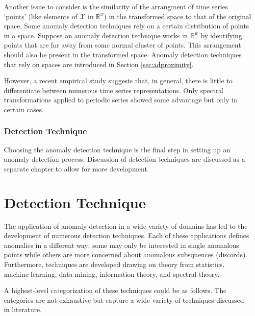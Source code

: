 Another issue to consider is the similarity of the arrangment of time series `points' (like elements of $\mathcal{X}$ in $\mathbb{R}^w$) in the transformed space to that of the original space. Some anomaly detection techniques rely on a certain distribution of points in a space. Suppose an anomaly detection technique works in $\mathbb{R}^w$ by identifying points that are far away from some normal cluster of points. This arrangement should also be present in the transformed space. Anomaly detection techniques that rely on spaces are introduced in Section \ref{sec:adproximity}.

However, a recent empirical study \cite{Wang2013} suggests that, in general, there is little to differentiate between numerous time series representations. Only spectral transformations applied to periodic series showed some advantage but only in certain cases.

\subsection{Detection Technique}

Choosing the anomaly detection technique is the final step in setting up an anomaly detection process. Discussion of detection techniques are discussed as a separate chapter to allow for more development.

\chapter{Detection Technique}
\label{ch:adtechnique}

The application of anomaly detection in a wide variety of domains has led to the development of numerous detection techniques. Each of these applications defines anomalies in a different way;  some  may only be interested in single anomalous points while others are more concerned about anomalous subsquences (discords). Furthermore, techniques are developed drawing on theory from statistics, machine learning, data mining, information theory, and spectral theory.

A highest-level categorization of these techniques could be as follows. The categories are not exhaustive but capture a wide variety of techniques discussed in literature.

